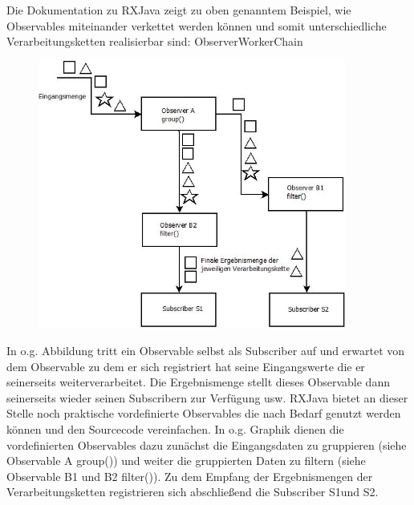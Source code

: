 \documentclass[12pt,oneside,a4paper,bibtotoc,liststotoc]{scrreprt}
\begin{document}
Die Dokumentation zu RXJava zeigt zu oben genanntem Beispiel, wie Observables miteinander verkettet werden können und somit unterschiedliche Verarbeitungsketten realisierbar sind:
ObserverWorkerChain
\begin{figure}[H]
  \begin{centering}
    \includegraphics[width=0.9\textwidth]{img/ObserverWorkerChain.jpeg}
    \label{ObserverWorkerChain}
  \end{centering}
\end{figure}
In o.g. Abbildung tritt ein Observable selbst als Subscriber auf und erwartet von dem Observable zu dem er sich registriert hat seine Eingangswerte die er seinerseits weiterverarbeitet. Die Ergebnismenge stellt dieses Observable dann seinerseits wieder seinen Subscribern zur Verfügung usw. RXJava bietet an dieser Stelle noch praktische vordefinierte Observables die nach Bedarf genutzt werden können und den Sourcecode vereinfachen. In o.g. Graphik dienen die vordefinierten Observables dazu zunächst die Eingangsdaten zu gruppieren (siehe Observable A group()) und weiter die gruppierten Daten zu filtern (siehe Observable B1 und B2 filter()). Zu dem Empfang der Ergebnismengen der Verarbeitungsketten registrieren sich abschließend die Subscriber S1und S2.
\end{document}
